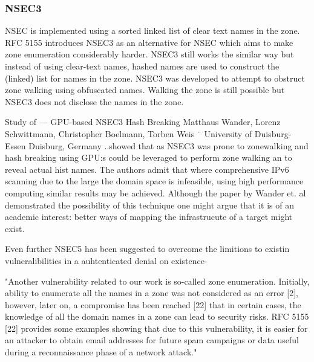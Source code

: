 \subsubsection{NSEC3}

NSEC is implemented using a sorted linked list of clear text names in the zone.
RFC 5155 introduces NSEC3 as an alternative for NSEC which aims to make zone enumeration considerably harder. NSEC3 still works the similar way but instead of using clear-text names, 
hashed names are used to construct the (linked) list for names in the zone. NSEC3 was developed to attempt to obstruct zone walking using obfuscated names. Walking the zone is still possible but NSEC3 does not disclose the names in the zone. 

Study of ---
GPU-based NSEC3 Hash Breaking
Matthaus Wander, Lorenz Schwittmann, Christopher Boelmann, Torben Weis ¨
University of Duisburg-Essen
Duisburg, Germany ..showed that as NSEC3 was prone to zonewalking and hash breaking using GPU:s  could be leveraged to perform zone walking an to reveal actual hist names. The authors admit that where comprehensive IPv6 scanning due to the large the domain space is infeasible, using high performance computing similar results may be achieved. Although the paper by Wander et. al demonstrated the possibility of this technique one might argue that it is of an academic interest: better ways of mapping the infrastrucute of a target might exist.


Even further NSEC5 has been suggested to overcome the limitions to existin vulneralibilities in a auhtenticated denial on existence-






"Another vulnerability related to our work is so-called zone
enumeration. Initially, ability to enumerate all the names in
a zone was not considered as an error [2], however, later on,
a compromise has been reached [22] that in certain cases,
the knowledge of all the domain names in a zone can lead
to security risks. RFC 5155 [22] provides some examples
showing that due to this vulnerability, it is easier for an attacker
to obtain email addresses for future spam campaigns or data
useful during a reconnaissance phase of a network attack."  \citet{global_zone_transfer}



